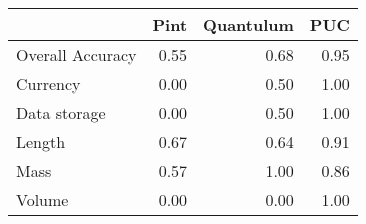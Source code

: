 \begin{tabular}{lrrr}
\toprule
{} &  Pint &  Quantulum &   PUC \\
\midrule
Overall Accuracy &  0.55 &       0.68 &  0.95 \\
Currency         &  0.00 &       0.50 &  1.00 \\
Data storage     &  0.00 &       0.50 &  1.00 \\
Length           &  0.67 &       0.64 &  0.91 \\
Mass             &  0.57 &       1.00 &  0.86 \\
Volume           &  0.00 &       0.00 &  1.00 \\
\bottomrule
\end{tabular}
